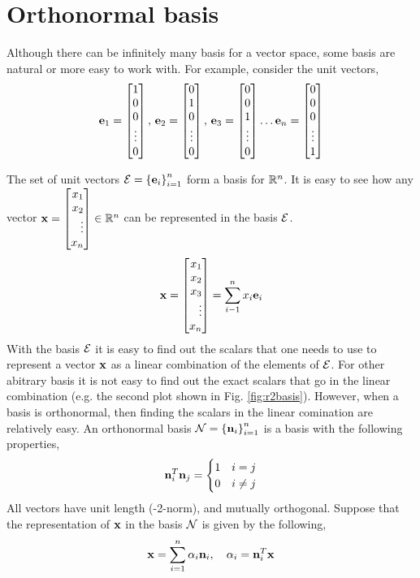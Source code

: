 \section{Orthonormal basis}
Although there can be infinitely many basis for a vector space, some basis are natural or more easy to work with. For example, consider the unit vectors, 
\[ \mf{e}_1 = \bmxc 1 \\0 \\0 \\ \vdots \\ 0\emx, \, \mf{e}_2 = \bmxc 0 \\1 \\0 \\ \vdots \\ 0\emx, \, \mf{e}_3 = \bmxc 0 \\0 \\ 1 \\ \vdots \\ 0\emx \ldots \mf{e}_n = \bmxc 0 \\0 \\0 \\ \vdots \\ 1\emx \]

The set of unit vectors $\mathcal{E} = \left\{ \mathbf{e}_i \right\}_{i=1}^n$ form a basis for $\mathbb{R}^n$. It is easy to see how any vector $\mf{x} = \bmx x_1\\ x_2 \\ \vdots \\ x_n\emx \in \mb{R}^n$ can be represented in the basis $\mathcal{E}$.
\[ \mf{x} = \bmx x_1\\ x_2 \\ x_3 \\ \vdots \\ x_n\emx = \sum_{i-1}^n x_i\mf{e}_i \]
With the basis $\mathcal{E}$ it is easy to find out the scalars that one needs to use to represent a vector $\mathbf{x}$ as a linear combination of the elements of $\mathcal{E}$. For other abitrary basis it is not easy to find out the exact scalars that go in the linear combination (e.g. the second plot shown in Fig. \ref{fig:r2basis}). However, when a basis is orthonormal, then finding the scalars in the linear comination are relatively easy. An orthonormal basis $\mathcal{N} = \left\{\mathbf{n}_i\right\}_{i=1}^n$ is a basis with the following properties,
\[ \mathbf{n}_i^T\mathbf{n}_j = \begin{cases} 1 & i = j \\ 0 & i \neq j \end{cases} \]
All vectors have unit length (-2-norm), and mutually orthogonal. Suppose that the representation of $\mathbf{x}$ in the basis $\mathcal{N}$ is given by the following,
\[ \mathbf{x} = \sum_{i=1}^{n} \alpha_i \mathbf{n}_i, \quad \alpha_i = \mathbf{n}_i^T\mathbf{x} \]

